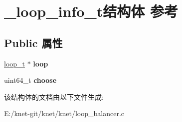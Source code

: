 \hypertarget{struct__loop__info__t}{}\section{\+\_\+loop\+\_\+info\+\_\+t结构体 参考}
\label{struct__loop__info__t}
\subsection*{Public 属性}
\begin{DoxyCompactItemize}
\item 
\hypertarget{struct__loop__info__t_a27388f8aa1919e1b8d9c7dc6595a8ecf}{}\hyperlink{struct__loop__t}{loop\+\_\+t} $\ast$ {\bfseries loop}\label{struct__loop__info__t_a27388f8aa1919e1b8d9c7dc6595a8ecf}

\item 
\hypertarget{struct__loop__info__t_a0aa153cf249b17bfe253fb07d307cb8d}{}uint64\+\_\+t {\bfseries choose}\label{struct__loop__info__t_a0aa153cf249b17bfe253fb07d307cb8d}

\end{DoxyCompactItemize}


该结构体的文档由以下文件生成\+:\begin{DoxyCompactItemize}
\item 
E\+:/knet-\/git/knet/knet/loop\+\_\+balancer.\+c\end{DoxyCompactItemize}
